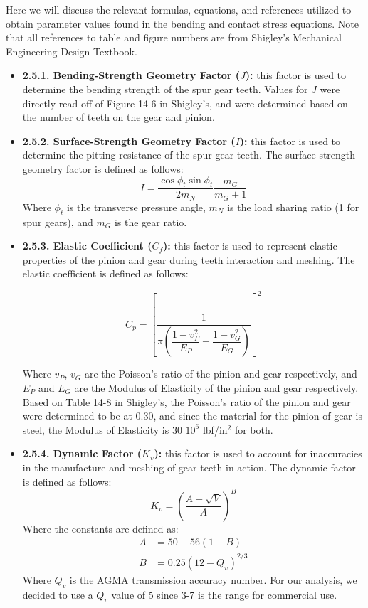 \documentclass[letterpaper,12pt]{article}
\begin{document}
\noindent Here we will discuss the relevant formulas, equations, and references utilized to obtain parameter values found in the bending and contact stress equations. Note that all references to table and figure numbers are from Shigley's Mechanical Engineering Design Textbook.
\begin{itemize}
    \item \textbf{2.5.1. Bending-Strength Geometry Factor ($J$):} this factor is used to determine the bending strength of the spur gear teeth. Values for $J$ were directly read off of Figure 14-6 in Shigley's, and were determined based on the number of teeth on the gear and pinion.
    
    \item \textbf{2.5.2. Surface-Strength Geometry Factor ($I$):} this factor is used to determine the pitting resistance of the spur gear teeth. The surface-strength geometry factor is defined as follows:
    \begin{equation}
        I = \dfrac{\cos\phi_t \sin\phi_t}{2m_N} \dfrac{m_G}{m_G + 1}
    \end{equation}
    Where $\phi_t$ is the transverse pressure angle, $m_N$ is the load sharing ratio (1 for spur gears), and $m_G$ is the gear ratio.
    
    \item \textbf{2.5.3. Elastic Coefficient ($C_f$):} this factor is used to represent elastic properties of the pinion and gear during teeth interaction and meshing. The elastic coefficient is defined as follows:
    
    \begin{equation}
        C_p = \left[\dfrac{1}{\pi \left(\dfrac{1-v_P^2}{E_P} + \dfrac{1 - v_G^2}{E_G}\right)}\right]^2
    \end{equation}
    
    Where $v_P$, $v_G$ are the Poisson's ratio of the pinion and gear respectively, and $E_P$ and $E_G$ are the Modulus of Elasticity of the pinion and gear respectively. Based on Table 14-8 in Shigley's, the Poisson's ratio of the pinion and gear were determined to be at 0.30, and since the material for the pinion of gear is steel, the Modulus of Elasticity is 30 \times $10^6$ lbf/in$^2$ for both. 
    
    \item \textbf{2.5.4. Dynamic Factor ($K_v$):} this factor is used to account for inaccuracies in the manufacture and meshing of gear teeth in action. The dynamic factor is defined as follows:
    \begin{equation}
        K_v = \left(\dfrac{A + \sqrt{V}}{A}\right)^B
    \end{equation}
    Where the constants are defined as:
    \begin{align*}
        A &= 50 + 56(1-B) \\
        B &= 0.25(12-Q_v)^{2/3}
    \end{align*}
    Where $Q_v$ is the AGMA transmission accuracy number. For our analysis, we decided to use a $Q_v$ value of 5 since 3-7 is the range for commercial use.
    

\end{itemize}
\end{document}
